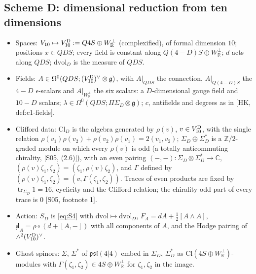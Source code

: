 \subsection{Scheme D: dimensional reduction from ten dimensions}

\begin{definition}[Scheme D]
\label{def:schemeD}
\mbox{}\begin{itemize}
\item Spaces: $V_{10}\mapsto V_{10}^{\rm D}:=Q4S\oplus W^\perp_{\mathbb R}$ (complexified), of formal dimension $10$; positions $x\in QDS$; every field is constant along $Q(4{-}D)S\oplus W^\perp_{\mathbb R}$; $d$ acts along $QDS$; $\mathrm{dvol}_D$ is the measure of $QDS$.
\item Fields: $A\in\Omega^0(QDS;(V_{10}^{\rm D})^\vee\otimes\mathfrak g)$, with $A|_{QDS}$ the connection, $A|_{Q(4-D)S}$ the $4-D$ $\epsilon$-scalars and $A|_{W^\perp_{\mathbb R}}$ the six scalars: a $D$-dimensional gauge field and $10-D$ scalars; $\lambda\in\Omega^0(QDS;\Pi\Sigma_D\otimes\mathfrak g)$; $c$, antifields and degrees as in [HK, def:c1-fields].
\item Clifford data: $\mathrm{Cl}_D$ is the algebra generated by $\rho(v)$, $v\in V_{10}^{\rm D}$, with the single relation $\rho(v_1)\rho(v_2)+\rho(v_2)\rho(v_1)=2(v_1,v_2)$; $\Sigma_D\oplus\Sigma_D^*$ is a $\mathbb Z/2$-graded module on which every $\rho(v)$ is odd (a totally anticommuting chirality, [S05, (2.6)]), with an even pairing $(-,-)\colon\Sigma_D\otimes\Sigma_D^*\to\mathbb C$, $(\rho(v)\zeta_1,\zeta_2)=(\zeta_1,\rho(v)\zeta_2)$, and $\Gamma$ defined by $(\rho(v)\zeta_1,\zeta_2)=(v,\Gamma(\zeta_1,\zeta_2))$. Traces of even products are fixed by $\operatorname{tr}_{\Sigma_D}1=16$, cyclicity and the Clifford relation; the chirality-odd part of every trace is $0$ [S05, footnote 1].
\item Action: $S_D$ is \eqref{eq:S4} with $\mathrm{dvol}\mapsto\mathrm{dvol}_D$, $F_A=dA+\frac12[A\wedge A]$, ${\not d}_A=\rho\circ(d+[A,-])$ with all components of $A$, and the Hodge pairing of $\wedge^2(V_{10}^{\rm D})^\vee$.
\item Ghost spinors: $\Sigma$, $\Sigma^*$ of $\mathfrak{psl}(4|4)$ embed in $\Sigma_D$, $\Sigma_D^*$ as $\mathrm{Cl}(4S\oplus W_{\mathbb R}^\perp)$-modules with $\Gamma(\zeta_1,\zeta_2)\in 4S\oplus W^\perp_{\mathbb R}$ for $\zeta_1,\zeta_2$ in the image.
\end{itemize}
\end{definition}

